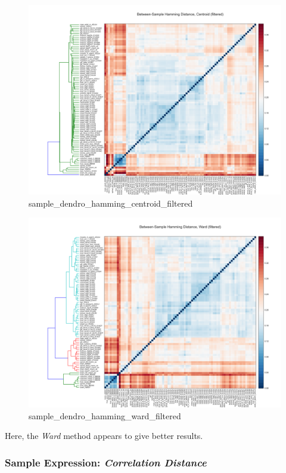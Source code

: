 \documentclass{article}
\begin{document}
\begin{figure}[htbp]
\centering
\includegraphics{sample_dendro_hamming_centroid_filtered.svg}
\caption{sample\_dendro\_hamming\_centroid\_filtered}
\end{figure}

\begin{figure}[htbp]
\centering
\includegraphics{sample_dendro_hamming_ward_filtered.svg}
\caption{sample\_dendro\_hamming\_ward\_filtered}
\end{figure}

Here, the \emph{Ward} method appears to give better results.


    \subsubsection{Sample Expression: \emph{Correlation Distance}}
\end{document}
